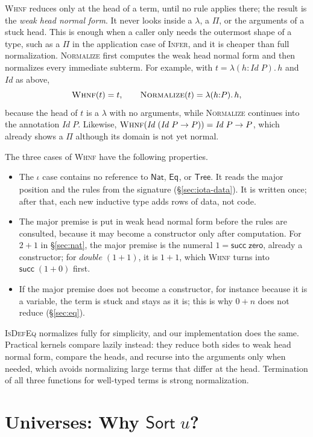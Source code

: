 \documentclass[acmsmall,screen,nonacm]{acmart}
\newcommand{\tLam}[3]{\lambda(#1{:}#2).\,#3}
\newcommand{\Nat}{\mathsf{Nat}}
\newcommand{\zero}{\mathsf{zero}}
\newcommand{\tsucc}{\mathsf{succ}}
\newcommand{\Eq}[1]{\mathsf{Eq}_{#1}}
\begin{document}
\textsc{Whnf} reduces only at the head of a term, until no rule applies there; the result is the \emph{weak head normal form}.
It never looks inside a $\lambda$, a $\Pi$, or the arguments of a stuck head.
This is enough when a caller only needs the outermost shape of a type, such as a $\Pi$ in the application case of \textsc{Infer}, and it is cheaper than full normalization.
\textsc{Normalize} first computes the weak head normal form and then normalizes every immediate subterm.
For example, with $t = \tLam{h}{\mathit{Id}\;P}{h}$ and $\mathit{Id}$ as above,
\[
\textsc{Whnf}(t) = t, \qquad \textsc{Normalize}(t) = \tLam{h}{P}{h},
\]
because the head of $t$ is a $\lambda$ with no arguments, while \textsc{Normalize} continues into the annotation $\mathit{Id}\;P$.
Likewise, $\textsc{Whnf}(\mathit{Id}\;(\mathit{Id}\;P \to P)) = \mathit{Id}\;P \to P$, which already shows a $\Pi$ although its domain is not yet normal.

The three cases of \textsc{Whnf} have the following properties.
\begin{itemize}
  \item The $\iota$ case contains no reference to $\Nat$, $\Eq{}$, or $\mathsf{Tree}$. It reads the major position and the rules from the signature (\S\ref{sec:iota-data}).
    It is written once; after that, each new inductive type adds rows of data, not code.
  \item The major premise is put in weak head normal form before the rules are consulted, because it may become a constructor only after computation.
    For $2 + 1$ in \S\ref{sec:nat}, the major premise is the numeral $1 = \tsucc\;\zero$, already a constructor;
    for $\mathit{double}\;(1 + 1)$, it is $1 + 1$, which \textsc{Whnf} turns into $\tsucc\;(1 + 0)$ first.
  \item If the major premise does not become a constructor, for instance because it is a variable, the term is stuck and stays as it is; this is why $0 + n$ does not reduce (\S\ref{sec:eq}).
\end{itemize}
\textsc{IsDefEq} normalizes fully for simplicity, and our implementation does the same.
Practical kernels compare lazily instead: they reduce both sides to weak head normal form, compare the heads, and recurse into the arguments only when needed,
which avoids normalizing large terms that differ at the head.
Termination of all three functions for well-typed terms is strong normalization.

\section{Universes: Why $\mathsf{Sort}\;u$?}
\label{sec:universes}
\end{document}

